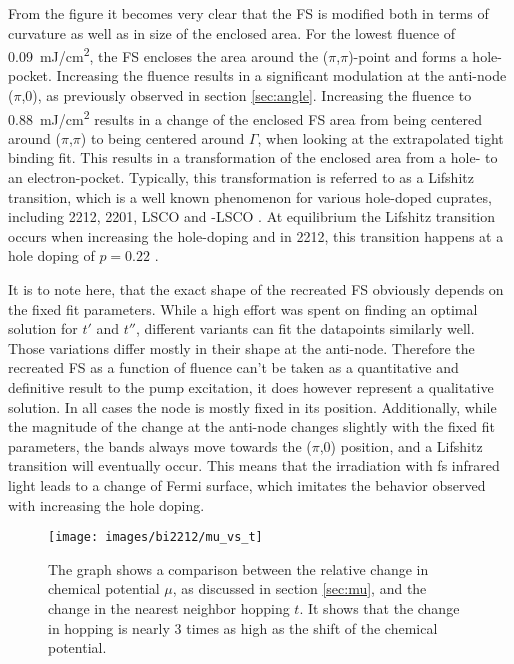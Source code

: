From the figure it becomes very clear that the FS is modified both in terms of curvature as well as in size of the enclosed area.
For the lowest fluence of \qty{0.09}{\milli\joule/\centi\meter\squared}, the FS encloses the area around the ($\pi$,$\pi$)-point and forms a hole-pocket.
Increasing the fluence results in a significant modulation at the anti-node ($\pi$,0), as previously observed in section \ref{sec:angle}.
Increasing the fluence to \qty{0.88}{\milli\joule/\centi\meter\squared} results in a change of the enclosed FS area from being centered around ($\pi$,$\pi$) to being centered around $\Gamma$, when looking at the extrapolated tight binding fit.
This results in a transformation of the enclosed area from a hole- to an electron-pocket.
Typically, this transformation is referred to as a Lifshitz transition, which is a well known phenomenon for various hole-doped cuprates, including 2212, 2201, LSCO and -LSCO \cite{kaminski_change_2006,matt_electron_2015,ding_disappearance_2019,kondo_hole-concentration_2004}.
At equilibrium the Lifshitz transition occurs when increasing the hole-doping and in 2212, this transition happens at a hole doping of $p=0.22$ \cite{kaminski_change_2006}.

It is to note here, that the exact shape of the recreated FS obviously depends on the fixed fit parameters.
While a high effort was spent on finding an optimal solution for $t'$ and $t''$, different variants can fit the datapoints similarly well.
Those variations differ mostly in their shape at the anti-node.
Therefore the recreated FS as a function of fluence can't be taken as a quantitative and definitive result to the pump excitation, it does however represent a qualitative solution.
In all cases the node is mostly fixed in its position.
Additionally, while the magnitude of the change at the anti-node changes slightly with the fixed fit parameters, the bands always move towards the ($\pi$,0) position, and a Lifshitz transition will eventually occur.
This means that the irradiation with \unit{\femto\second} infrared light leads to a change of Fermi surface, which imitates the behavior observed with increasing the hole doping. 

\begin{figure}
	\centering
	\texttt{[image: images/bi2212/mu\_vs\_t]}
	\caption{The graph shows a comparison between the relative change in chemical potential $\mu$, as discussed in section \ref{sec:mu}, and the change in the nearest neighbor hopping $t$. It shows that the change in hopping is nearly 3 times as high as the shift of the chemical potential.}
	\label{fig:mu_t}
\end{figure}


